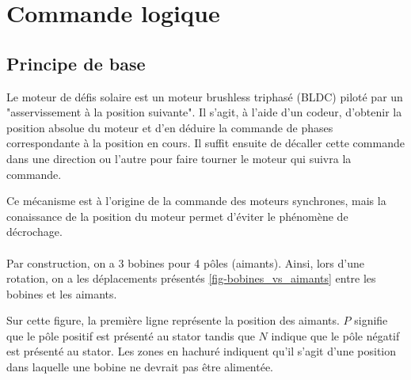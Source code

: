\section{Commande logique}
\subsection{Principe de base}
\label{sec-cmd_principes_base}
Le moteur de défis solaire est un moteur brushless triphasé (BLDC) piloté par un "asservissement à la position suivante".
Il s'agit, à l'aide d'un codeur, d'obtenir la position absolue du moteur et d'en déduire la commande de phases correspondante à la position en cours.
Il suffit ensuite de décaller cette commande dans une direction ou l'autre pour faire tourner le moteur qui suivra la commande.

Ce mécanisme est à l'origine de la commande des moteurs synchrones, mais la conaissance de la position du moteur permet d'éviter le phénomène de décrochage.

\paragraph{}
Par construction, on a 3 bobines pour 4 pôles (aimants). Ainsi, lors d'une rotation, on a les déplacements présentés 
\cref{fig-bobines_vs_aimants} entre les bobines et les aimants.

Sur cette figure, la première ligne représente la position des aimants. $P$ signifie que le pôle positif est présenté au stator tandis que $N$ indique que le pôle négatif est présenté au stator.
Les zones en hachuré indiquent qu'il s'agit d'une position dans laquelle une bobine ne devrait pas être alimentée.

